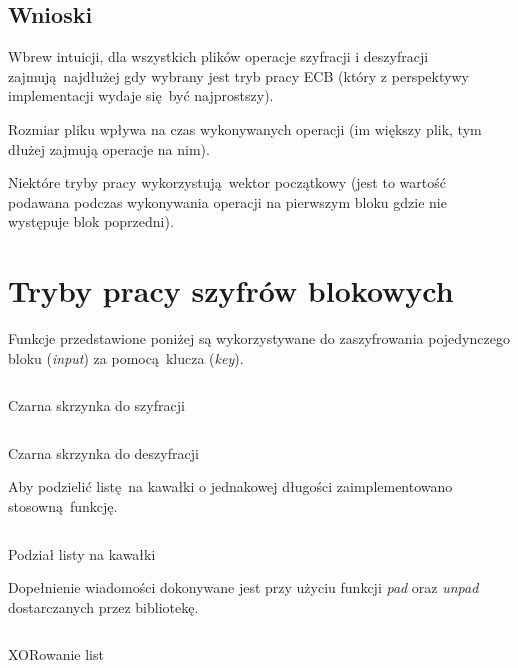 \documentclass[12pt]{article}
\newenvironment*{dummyenv}{}{}
\begin{document}
\begin{dummyenv}
	\inputminted[firstline=182,lastline=271]{yaml}{2-enc-dec-time.txt}
\end{dummyenv}

\subsection{Wnioski}

Wbrew intuicji, dla wszystkich plików operacje szyfracji i deszyfracji
zajmują najdłużej gdy wybrany jest tryb pracy ECB (który z perspektywy implementacji
wydaje się być najprostszy).

Rozmiar pliku wpływa na czas wykonywanych operacji (im większy plik, tym dłużej
zajmują operacje na nim).

Niektóre tryby pracy wykorzystują wektor początkowy (jest to wartość podawana
podczas wykonywania operacji na pierwszym bloku gdzie nie występuje blok poprzedni).

\newpage

\section{Tryby pracy szyfrów blokowych}

Funkcje przedstawione poniżej są wykorzystywane do zaszyfrowania pojedynczego
bloku (\textit{input}) za pomocą klucza (\textit{key}).

\begin{listing}[H]
	\inputminted[firstline=9,lastline=13]{python}{../aes.py}
	\caption{Czarna skrzynka do szyfracji}
\end{listing}

\begin{listing}[H]
	\inputminted[firstline=15,lastline=19]{python}{../aes.py}
	\caption{Czarna skrzynka do deszyfracji}
\end{listing}

Aby podzielić listę na kawałki o jednakowej długości 
zaimplementowano stosowną funkcję.

\begin{listing}[H]
	\inputminted[firstline=21,lastline=24]{python}{../aes.py}
	\caption{Podział listy na kawałki}
\end{listing}

Dopełnienie wiadomości dokonywane jest przy użyciu funkcji
\textit{pad} oraz \textit{unpad} dostarczanych przez bibliotekę.

\begin{listing}[H]
	\inputminted[firstline=26,lastline=28]{python}{../aes.py}
	\caption{XORowanie list}
\end{listing}
\end{document}
